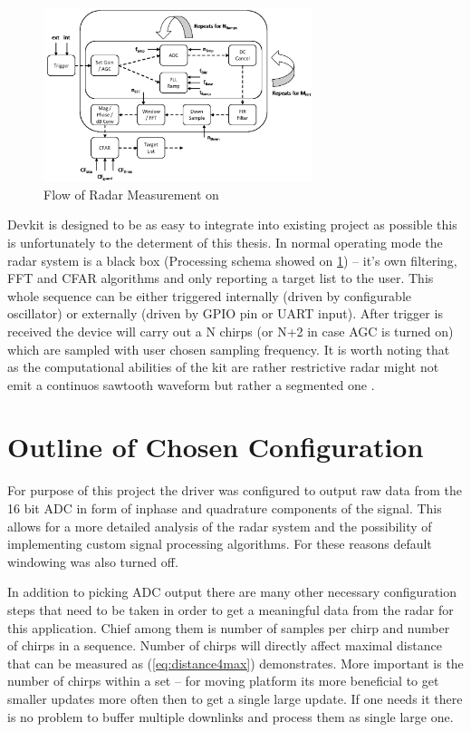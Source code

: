 \begin{figure}[h!]
	\centering
	\includegraphics[width=0.7\textwidth]{../img/sidar_flow.png}
	\caption[Flow of Radar Measurement on \sidar \cite{sidarPRO}]{Flow of Radar Measurement on \sidar}
	\label{fig:sidarFlow}
\end{figure}

Devkit is designed to be as easy to integrate into existing project as possible this is unfortunately to the determent of this thesis.
In normal operating mode the radar system is a black box (Processing schema showed on \ref{fig:sidarFlow}) -- it's own filtering, FFT and CFAR algorithms and only reporting a target list to the user.
This whole sequence can be either triggered internally (driven by configurable oscillator) or externally (driven by GPIO pin or UART input).
After trigger is received the device will carry out a N chirps (or N+2 in case AGC is turned on) which are sampled with user chosen sampling frequency.
It is worth noting that as the computational abilities of the kit are rather restrictive radar might not emit a continuos sawtooth waveform but rather a segmented one \cite{sidarPRO}.

\section{Outline of Chosen Configuration }


For purpose of this project the driver was configured to output raw data from the 16 bit ADC in form of inphase and quadrature components of the signal.
This allows for a more detailed analysis of the radar system and the possibility of implementing custom signal processing algorithms.
For these reasons default windowing was also turned off.

In addition to picking ADC output there are many other necessary configuration steps that need to be taken in order to get a meaningful data from the radar for this application.
Chief among them is number of samples per chirp and number of chirps in a sequence.
Number of chirps will directly affect maximal distance that can be measured as (\ref{eq:distance4max}) demonstrates.
More important is the number of chirps within a set -- for moving platform its more beneficial to get smaller updates more often then to get a single large update.
If one needs it there is no problem to buffer multiple downlinks and process them as single large one.

